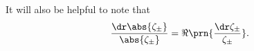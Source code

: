 \documentclass[12pt]{article}
\begin{document}
It will also be helpful to note that
%
\begin{equation}\label{eqdabsz}
  \frac{\dr\abs{\zeta_\pm}}{\abs{\zeta_\pm}} = \Re\prn{\frac{\dr\zeta_\pm}{\zeta_\pm}}.
\end{equation}
%








\end{document}
